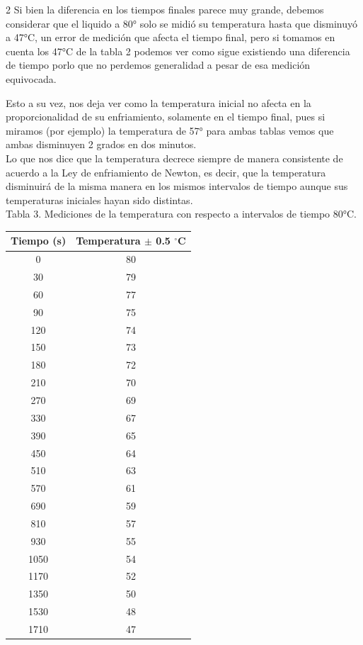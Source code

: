 \documentclass[11pt,letterpaper]{article}
\begin{document}
\begin{multicols}{2}
Si bien la diferencia en los tiempos finales parece muy grande, debemos considerar que el liquido a 80° solo se midió su temperatura hasta que disminuyó a 47°C, un error de medición que afecta el tiempo final, pero si tomamos en cuenta los 47°C de la tabla 2 podemos ver como sigue existiendo una diferencia de tiempo porlo que no perdemos generalidad a pesar de esa medición equivocada.

Esto a su vez, nos deja ver como la temperatura inicial no afecta en la proporcionalidad de su enfriamiento, solamente en el tiempo final, pues si miramos (por ejemplo) la temperatura de 57° para ambas tablas vemos que ambas disminuyen 2 grados en dos minutos.\\ Lo que nos dice que la temperatura decrece siempre de manera consistente de acuerdo a la Ley de enfriamiento de Newton, es decir, que la temperatura disminuirá de la misma manera en los mismos intervalos de tiempo aunque sus temperaturas iniciales hayan sido distintas.\\



Tabla 3. Mediciones de la temperatura con respecto a intervalos de tiempo 80°C.

\begin{tabular}{|c|c|}
	\hline
	\textbf{Tiempo (s)} & \textbf{Temperatura  $\pm$ 0.5 $^\circ$C} \\ \hline
	0    & 80  \\ \hline
	30   & 79  \\ \hline
	60   & 77  \\ \hline
	90   & 75  \\ \hline
	120  & 74  \\ \hline
	150  & 73  \\ \hline
	180  & 72  \\ \hline
	210  & 70  \\ \hline
	270  & 69  \\ \hline
	330  & 67  \\ \hline
	390  & 65  \\ \hline
	450  & 64  \\ \hline
	510  & 63  \\ \hline
	570  & 61  \\ \hline
	690  & 59  \\ \hline
	810  & 57  \\ \hline
	930  & 55  \\ \hline
	1050 & 54  \\ \hline
	1170 & 52  \\ \hline
	1350 & 50  \\ \hline
	1530 & 48  \\ \hline
	1710 & 47  \\ \hline
\end{tabular}



\end{multicols}
\end{document}

